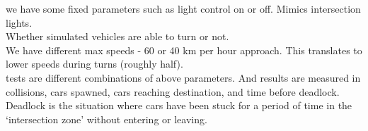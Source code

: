 we have some fixed parameters such as light control on or off. Mimics intersection lights.\\
Whether simulated vehicles are able to turn or not.\\
We have different max speeds - 60 or 40 km per hour approach. This translates to lower speeds during turns (roughly half).\\

tests are different combinations of above parameters. And results are measured in collisions, cars spawned, cars reaching destination, and time before deadlock.\\
Deadlock is the situation where cars have been stuck for a period of time in the `intersection zone' without entering or leaving.



